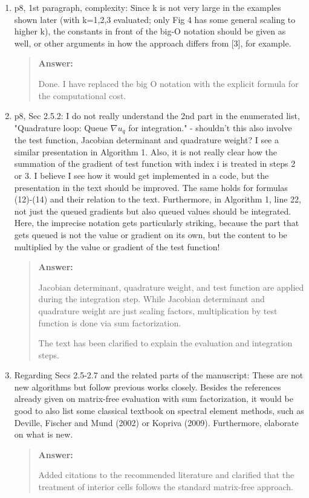 \documentclass[11pt, a4paper]{article}
\newenvironment{answer}{%
      \begin{quote}%
            \color{blue!80!black}%
            \textbf{Answer:}%
            }{%
      \end{quote}%
}
\begin{document}
\begin{enumerate}[label=\textbullet, wide, labelindent=0pt]
      \item p8, 1st paragraph, complexity: Since k is not very large in the examples shown later (with k=1,2,3
            evaluated; only Fig 4 has some general scaling to higher k), the constants in front of the big-O notation
            should be
            given as well, or other arguments in how the approach differs from [3], for example.
            \begin{answer}
                  Done. I have replaced the big O notation with the explicit formula for the computational
                  cost.
            \end{answer}

      \item p8, Sec 2.5.2: I do not really understand the 2nd part in the enumerated list, "Quadrature loop: Queue
            \(\nabla u_q\) for integration." - shouldn't this also involve the test function, Jacobian determinant and
            quadrature
            weight? I see a similar presentation in Algorithm 1. Also, it is not really clear how the summation of the
            gradient of
            test function with index i is treated in steps 2 or 3. I believe I see how it would get implemented in a
            code, but the
            presentation in the text should be improved. The same holds for formulas (12)-(14) and their relation to
            the
            text.
            Furthermore, in Algorithm 1, line 22, not just the queued gradients but also queued values should be
            integrated. Here,
            the imprecise notation gets particularly striking, because the part that gets queued is not the value or
            gradient on
            its own, but the content to be multiplied by the value or gradient of the test function!
            \begin{answer}
                  Jacobian determinant, quadrature weight, and test function are applied during the
                  integration
                  step.
                  While Jacobian determinant and quadrature weight are just scaling factors, multiplication by test
                  function is done via sum factorization.

                  The text has been clarified to explain the evaluation and integration steps.
            \end{answer}

      \item Regarding Secs 2.5-2.7 and the related parts of the manuscript: These are not new algorithms but follow
            previous works closely. Besides the references already given on matrix-free evaluation with sum
            factorization, it would
            be good to also list some classical textbook on spectral element methods, such as Deville, Fischer and Mund
            (2002) or
            Kopriva (2009). Furthermore, elaborate on what is new.
            \begin{answer}
                  Added citations to the recommended literature and clarified that the treatment of interior cells
                  follows the standard matrix-free approach.
            \end{answer}


\end{enumerate}
\end{document}
